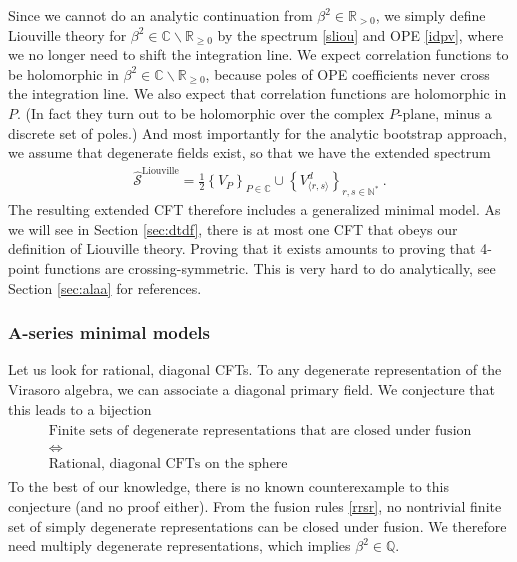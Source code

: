 \documentclass[12pt, a4paper]{article}
\begin{document}
Since we cannot do an analytic continuation from $\beta^2\in \mathbb{R}_{>0}$,
we simply define Liouville theory for $\beta^2\in \mathbb{C}\backslash\mathbb{R}_{\geq 0}$
by the spectrum \eqref{sliou} and OPE \eqref{idpv}, where we no longer need to shift the integration line. We expect correlation functions to be holomorphic in $\beta^2\in \mathbb{C}\backslash\mathbb{R}_{\geq 0}$, because poles of OPE coefficients never cross the integration line. We also expect that correlation functions are holomorphic in $P$. (In fact they turn out to be holomorphic over the complex $P$-plane, minus a discrete set of poles.) And most importantly for the analytic bootstrap approach, we assume that degenerate fields exist, so that we have the extended spectrum
\begin{align}
 \boxed{ \widehat{\mathcal{S}}^\text{Liouville} = \frac12 \left\{ V_P\right\}_{P\in \mathbb{C}} \cup \left\{ V^d_{\langle r,s\rangle}\right\}_{r,s\in\mathbb{N}^*} }\ .
 \label{stliou}
\end{align}
The resulting extended CFT therefore includes a generalized minimal model. As we will see in Section \ref{sec:dtdf}, there is at most one CFT that obeys our definition of Liouville theory. Proving that it exists amounts to proving that 4-point functions are crossing-symmetric. This is very hard to do analytically, see Section \ref{sec:alaa} for references.

\subsubsection{A-series minimal models}\label{sec:amm}

Let us look for rational, diagonal CFTs. 
To any degenerate representation of the Virasoro algebra, we can associate a diagonal primary field. We conjecture that this leads to a bijection 
\begin{align}
\begin{array}{c}
 \text{Finite sets of degenerate representations that are closed under fusion}
 \\
 \iff 
 \\
 \text{Rational, diagonal CFTs on the sphere}
\end{array}
\end{align}
To the best of our knowledge, there is no known counterexample to this conjecture (and no proof either). 
From the fusion rules \eqref{rrsr}, no nontrivial finite set of simply degenerate representations can be closed under fusion. We therefore need multiply degenerate representations, which implies $\beta^2\in\mathbb{Q}$.  
\end{document}
